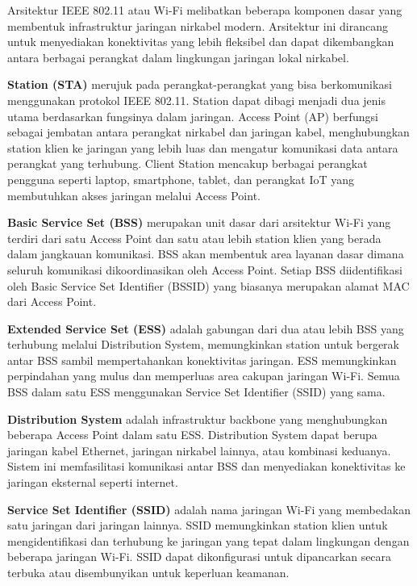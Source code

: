 Arsitektur IEEE 802.11 atau Wi-Fi melibatkan beberapa komponen dasar yang membentuk infrastruktur jaringan nirkabel modern. Arsitektur ini dirancang untuk menyediakan konektivitas yang lebih fleksibel dan dapat dikembangkan antara berbagai perangkat dalam lingkungan jaringan lokal nirkabel.


\textbf{Station (STA)} merujuk pada perangkat-perangkat yang bisa berkomunikasi menggunakan protokol IEEE 802.11. Station dapat dibagi menjadi dua jenis utama berdasarkan fungsinya dalam jaringan. Access Point (AP) berfungsi sebagai jembatan antara perangkat nirkabel dan jaringan kabel, menghubungkan station klien ke jaringan yang lebih luas dan mengatur komunikasi data antara perangkat yang terhubung. Client Station mencakup berbagai perangkat pengguna seperti laptop, smartphone, tablet, dan perangkat IoT yang membutuhkan akses jaringan melalui Access Point.

\textbf{Basic Service Set (BSS)} merupakan unit dasar dari arsitektur Wi-Fi yang terdiri dari satu Access Point dan satu atau lebih station klien yang berada dalam jangkauan komunikasi. BSS akan membentuk area layanan dasar dimana seluruh komunikasi dikoordinasikan oleh Access Point. Setiap BSS diidentifikasi oleh Basic Service Set Identifier (BSSID) yang biasanya merupakan alamat MAC dari Access Point.

\textbf{Extended Service Set (ESS)} adalah gabungan dari dua atau lebih BSS yang terhubung melalui Distribution System, memungkinkan station untuk bergerak antar BSS sambil mempertahankan konektivitas jaringan. ESS memungkinkan perpindahan yang mulus dan memperluas area cakupan jaringan Wi-Fi. Semua BSS dalam satu ESS menggunakan Service Set Identifier (SSID) yang sama.

\textbf{Distribution System} adalah infrastruktur backbone yang menghubungkan beberapa Access Point dalam satu ESS. Distribution System dapat berupa jaringan kabel Ethernet, jaringan nirkabel lainnya, atau kombinasi keduanya. Sistem ini memfasilitasi komunikasi antar BSS dan menyediakan konektivitas ke jaringan eksternal seperti internet.

\textbf{Service Set Identifier (SSID)} adalah nama jaringan Wi-Fi yang membedakan satu jaringan dari jaringan lainnya. SSID memungkinkan station klien untuk mengidentifikasi dan terhubung ke jaringan yang tepat dalam lingkungan dengan beberapa jaringan Wi-Fi. SSID dapat dikonfigurasi untuk dipancarkan secara terbuka atau disembunyikan untuk keperluan keamanan.

